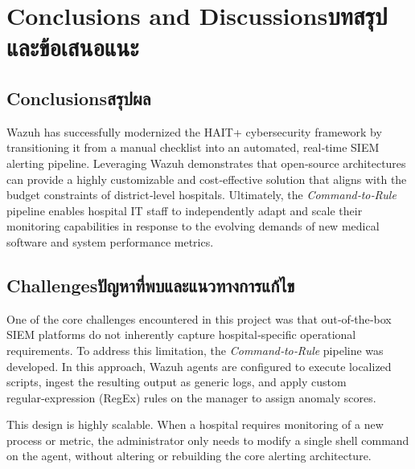 \chapter{\ifenglish Conclusions and Discussions\else บทสรุปและข้อเสนอแนะ\fi}

\section{\ifenglish Conclusions\else สรุปผล\fi}

Wazuh has successfully modernized the HAIT+ cybersecurity framework by transitioning it from a manual checklist into an automated, real‑time SIEM alerting pipeline. Leveraging Wazuh demonstrates that open‑source architectures can provide a highly customizable and cost‑effective solution that aligns with the budget constraints of district‑level hospitals. Ultimately, the \textit{Command‑to‑Rule} pipeline enables hospital IT staff to independently adapt and scale their monitoring capabilities in response to the evolving demands of new medical software and system performance metrics.

\section{\ifenglish Challenges\else ปัญหาที่พบและแนวทางการแก้ไข\fi}

One of the core challenges encountered in this project was that out‑of‑the‑box SIEM platforms do not inherently capture hospital‑specific operational requirements. To address this limitation, the \textit{Command‑to‑Rule} pipeline was developed. In this approach, Wazuh agents are configured to execute localized scripts, ingest the resulting output as generic logs, and apply custom regular‑expression (RegEx) rules on the manager to assign anomaly scores.

This design is highly scalable. When a hospital requires monitoring of a new process or metric, the administrator only needs to modify a single shell command on the agent, without altering or rebuilding the core alerting architecture.

